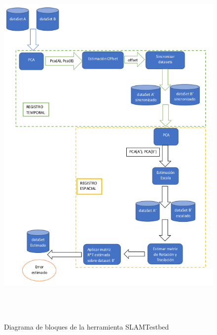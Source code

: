\begin{figure}
\begin{center}
\label{fig:Open File}\includegraphics[height=18.0cm,width=12.0cm]{img/cap5/EsquemaTFM_CajaBlanca_Transformaciones4.png}
\hspace{0.5cm}
\end{center}
\caption{ Diagrama de bloques de la herramienta SLAMTestbed }
\end{figure}

